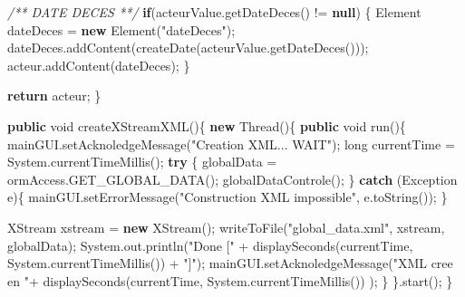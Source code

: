 \documentclass[]{article}
\newenvironment{Shaded}{}{}
\newcommand{\KeywordTok}[1]{\textcolor[rgb]{0.00,0.44,0.13}{\textbf{{#1}}}}
\newcommand{\DataTypeTok}[1]{\textcolor[rgb]{0.56,0.13,0.00}{{#1}}}
\newcommand{\StringTok}[1]{\textcolor[rgb]{0.25,0.44,0.63}{{#1}}}
\newcommand{\CommentTok}[1]{\textcolor[rgb]{0.38,0.63,0.69}{\textit{{#1}}}}
\newcommand{\FunctionTok}[1]{\textcolor[rgb]{0.02,0.16,0.49}{{#1}}}
\newcommand{\BuiltInTok}[1]{{#1}}
\newcommand{\NormalTok}[1]{{#1}}
\begin{document}
\begin{Shaded}
\begin{Highlighting}[]
		\CommentTok{/** DATE DECES **/}
		\KeywordTok{if}\NormalTok{(acteurValue.}\FunctionTok{getDateDeces}\NormalTok{() != }\KeywordTok{null}\NormalTok{) \{}
			\BuiltInTok{Element} \NormalTok{dateDeces = }\KeywordTok{new} \BuiltInTok{Element}\NormalTok{(}\StringTok{"dateDeces"}\NormalTok{);}
			\NormalTok{dateDeces.}\FunctionTok{addContent}\NormalTok{(}\FunctionTok{createDate}\NormalTok{(acteurValue.}\FunctionTok{getDateDeces}\NormalTok{()));}
			\NormalTok{acteur.}\FunctionTok{addContent}\NormalTok{(dateDeces);}
		\NormalTok{\}}

		\KeywordTok{return} \NormalTok{acteur;}
	\NormalTok{\}}

	\KeywordTok{public} \DataTypeTok{void} \FunctionTok{createXStreamXML}\NormalTok{()\{}
	  \KeywordTok{new} \BuiltInTok{Thread}\NormalTok{()\{}
		\KeywordTok{public} \DataTypeTok{void} \FunctionTok{run}\NormalTok{()\{}
		  \NormalTok{mainGUI.}\FunctionTok{setAcknoledgeMessage}\NormalTok{(}\StringTok{"Creation XML... WAIT"}\NormalTok{);}
		  \DataTypeTok{long} \NormalTok{currentTime = }\BuiltInTok{System}\NormalTok{.}\FunctionTok{currentTimeMillis}\NormalTok{();}
		  \KeywordTok{try} \NormalTok{\{}
			\NormalTok{globalData = ormAccess.}\FunctionTok{GET_GLOBAL_DATA}\NormalTok{();}
			\FunctionTok{globalDataControle}\NormalTok{();}
		  \NormalTok{\}}
		  \KeywordTok{catch} \NormalTok{(}\BuiltInTok{Exception} \NormalTok{e)\{}
			\NormalTok{mainGUI.}\FunctionTok{setErrorMessage}\NormalTok{(}\StringTok{"Construction XML impossible"}\NormalTok{, e.}\FunctionTok{toString}\NormalTok{());}
		  \NormalTok{\}}

		  \NormalTok{XStream xstream = }\KeywordTok{new} \FunctionTok{XStream}\NormalTok{();}
		  \FunctionTok{writeToFile}\NormalTok{(}\StringTok{"global_data.xml"}\NormalTok{, xstream, globalData);}
		  \BuiltInTok{System}\NormalTok{.}\FunctionTok{out}\NormalTok{.}\FunctionTok{println}\NormalTok{(}\StringTok{"Done ["} \NormalTok{+ }
		    \FunctionTok{displaySeconds}\NormalTok{(currentTime, }\BuiltInTok{System}\NormalTok{.}\FunctionTok{currentTimeMillis}\NormalTok{()) + }\StringTok{"]"}\NormalTok{);}
		  \NormalTok{mainGUI.}\FunctionTok{setAcknoledgeMessage}\NormalTok{(}\StringTok{"XML cree en "}\NormalTok{+ }
		    \FunctionTok{displaySeconds}\NormalTok{(currentTime, }\BuiltInTok{System}\NormalTok{.}\FunctionTok{currentTimeMillis}\NormalTok{()) );}
		\NormalTok{\}}
		\NormalTok{\}.}\FunctionTok{start}\NormalTok{();}
	\NormalTok{\}}


\end{Highlighting}
\end{Shaded}
\end{document}

